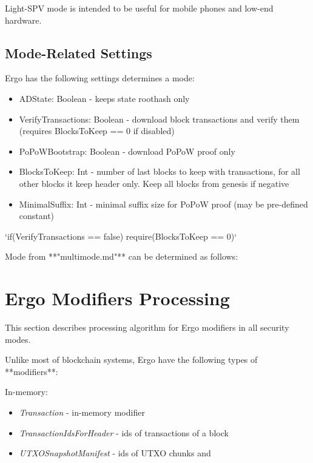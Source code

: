 \documentclass[]{report}   %
\begin{document}
Light-SPV mode is intended to be useful for mobile phones and low-end hardware. 

\subsection{Mode-Related Settings}

Ergo has the following settings determines a mode:
\begin{itemize}
  \item{ADState: Boolean} - keeps state roothash only 
  \item{VerifyTransactions: Boolean} - download block transactions and verify them (requires BlocksToKeep == 0 if disabled)
  \item{PoPoWBootstrap: Boolean} - download PoPoW proof only
  \item{BlocksToKeep: Int} - number of last blocks to keep with transactions, for all other blocks it keep header only. Keep all blocks from genesis if negative
  \item{MinimalSuffix: Int} - minimal suffix size for PoPoW proof (may be pre-defined constant)
\end{itemize}

`if(VerifyTransactions == false) require(BlocksToKeep == 0)`

Mode from **"multimode.md"** can be determined as follows:



\section{Ergo Modifiers Processing}

This section describes processing algorithm for Ergo modifiers in all security modes.

Unlike most of blockchain systems, Ergo have the following types of **modifiers**:

In-memory:
\begin{itemize}
  \item{\em Transaction} - in-memory modifier
  \item{\em TransactionIdsForHeader} - ids of transactions of a block
  \item{\em UTXOSnapshotManifest} - ids of UTXO chunks and 
\end{itemize}
\end{document}
